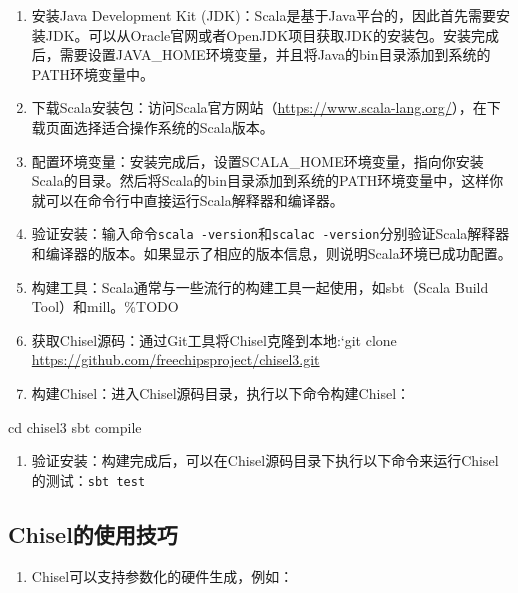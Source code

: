 \begin{enumerate}
\def\labelenumi{\arabic{enumi}.}
\tightlist
\item
  安装Java Development Kit (JDK)：Scala是基于Java平台的，因此首先需要安装JDK。可以从Oracle官网或者OpenJDK项目获取JDK的安装包。安装完成后，需要设置JAVA\_HOME环境变量，并且将Java的bin目录添加到系统的PATH环境变量中。
\item
  下载Scala安装包：访问Scala官方网站（\url{https://www.scala-lang.org/}），在下载页面选择适合操作系统的Scala版本。
\item
  配置环境变量：安装完成后，设置SCALA\_HOME环境变量，指向你安装Scala的目录。然后将Scala的bin目录添加到系统的PATH环境变量中，这样你就可以在命令行中直接运行Scala解释器和编译器。
\item
  验证安装：输入命令\texttt{scala\ -version}和\texttt{scalac\ -version}分别验证Scala解释器和编译器的版本。如果显示了相应的版本信息，则说明Scala环境已成功配置。
\item
  构建工具：Scala通常与一些流行的构建工具一起使用，如sbt（Scala Build Tool）和mill。\%TODO
\item
  获取Chisel源码：通过Git工具将Chisel克隆到本地:`git clone \url{https://github.com/freechipsproject/chisel3.git}
\item
  构建Chisel：进入Chisel源码目录，执行以下命令构建Chisel：
\end{enumerate}

\begin{CodeBlock}[language=BookShell]
cd chisel3
sbt compile
\end{CodeBlock}

\begin{enumerate}
\def\labelenumi{\arabic{enumi}.}
\setcounter{enumi}{7}
\tightlist
\item
  验证安装：构建完成后，可以在Chisel源码目录下执行以下命令来运行Chisel的测试：\texttt{sbt\ test}
\end{enumerate}

\subsection{Chisel的使用技巧}\label{sec:06-agility-010}

\begin{enumerate}
\def\labelenumi{\arabic{enumi}.}
\tightlist
\item
  Chisel可以支持参数化的硬件生成，例如：
\end{enumerate}

